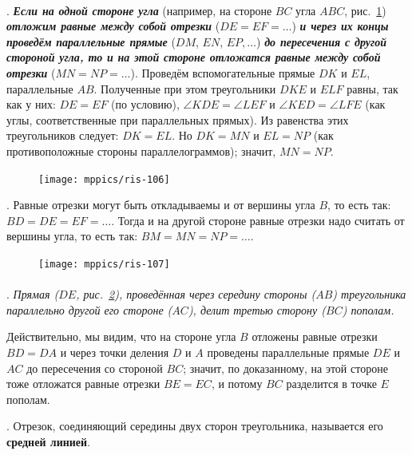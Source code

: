 \documentclass[oneside]{book}
\makeatletter
\newcommand{\rindex}[2][\imki@jobname]{%
  \index[#1]{\detokenize{#2}}%
}
\makeatother
\begin{document}
\paragraph{}\label{1938/95}
.
\textbf{\emph{Если на одной стороне угла}} (например, на стороне $BC$ угла $ABC$, рис.~\ref{1938/ris-106}) \textbf{\emph{отложим равные между собой отрезки}} ($DE=EF=\dots$) \textbf{\emph{и через их концы проведём параллельные прямые}} ($DM$, $EN$, $EP,\dots$) \textbf{\emph{до пересечения с другой стороной угла, то и на этой стороне отложатся равные между собой отрезки}} ($MN=NP=\dots$).
Проведём вспомогательные прямые $DK$ и $EL$, параллельные $AB$.
Полученные при этом треугольники $DKE$ и $ELF$ равны, так как у них:
$DE=EF$ (по условию), $\angle KDE=\angle LEF$ и $\angle KED = \angle LFE$ (как углы, соответственные при параллельных прямых).
Из равенства этих треугольников следует:
$DK=EL$.
Но $DK=MN$ и $EL=NP$ (как противоположные стороны параллелограммов);
значит, $MN=NP$.

\begin{figure}[h!]
\centering
\texttt{[image: mppics/ris-106]}
\caption{}\label{1938/ris-106}
\end{figure}

\smallskip
{}.
Равные отрезки могут быть откладываемы и от вершины угла $B$, то есть
так:
$BD=DE= EF=\dots$.
Тогда и на другой стороне равные отрезки надо считать от вершины угла, то есть так:
$BM=MN=NP=\dots$.

\begin{figure}
\vskip-9mm
\centering
\texttt{[image: mppics/ris-107]}
\caption{}\label{1938/ris-107}
\end{figure}

\paragraph{}\label{1938/96}
\mbox{.}
\emph{Прямая \emph{($DE$, рис.~\ref{1938/ris-107}),} проведённая через середину стороны ($AB$) треугольника параллельно другой его стороне ($AC$), делит третью сторону ($BC$) пополам.}

Действительно, мы видим, что на стороне угла $B$ отложены равные отрезки $BD=DA$ и через точки деления $D$ и $A$ проведены параллельные прямые $DE$ и $AC$ до пересечения со стороной $BC$;
значит, по доказанному, на этой стороне тоже отложатся равные отрезки $BE=EC$, и потому $BC$ разделится в точке $E$ пополам.

\smallskip
\mbox{.}
Отрезок, соединяющий середины двух сторон треугольника, называется его \rindex{средняя линия!треугольника}\textbf{средней линией}.
\end{document}
